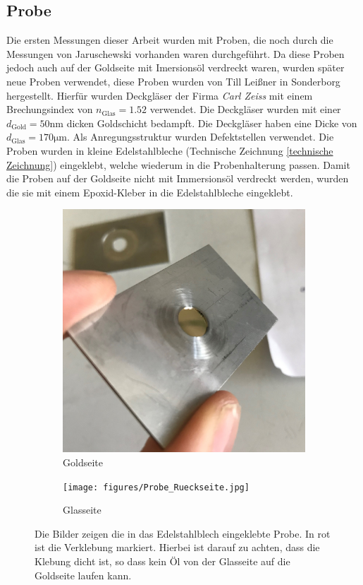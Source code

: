 \documentclass{article}
\begin{document}
\subsection{Probe}
	Die ersten Messungen dieser Arbeit wurden mit Proben, die noch durch die Messungen von Jaruschewski \cite{Jaruschewski.2020} vorhanden waren durchgeführt. Da diese Proben jedoch auch auf der Goldseite mit Imersionsöl verdreckt waren, wurden später neue Proben verwendet, diese Proben wurden von Till Leißner in Sonderborg hergestellt. Hierfür wurden Deckgläser der Firma \textit{Carl Zeiss} mit einem Brechungsindex von $n_{\mathrm{Glas}}= 1.52$ verwendet. Die Deckgläser wurden mit einer $d_{\mathrm{Gold}} = 50\mathrm{nm}$ dicken Goldschicht bedampft. Die Deckgläser haben eine Dicke von $d_{\mathrm{Glas}} = 170 \mathrm{\mu m}$. Als Anregungsstruktur wurden Defektstellen verwendet. Die Proben wurden in kleine Edelstahlbleche (Technische Zeichnung \ref{technische Zeichnung}) eingeklebt, welche wiederum in die Probenhalterung passen. Damit die Proben auf der Goldseite nicht mit Immersionsöl verdreckt werden, wurden die sie mit einem Epoxid-Kleber in die Edelstahlbleche eingeklebt.
	\begin{figure}
		\centering
		\begin{subfigure}[b]{0.4\textwidth}
			\centering
			\includegraphics[width=\textwidth]{figures/Probe_Vorderseite.jpg}
			\caption{Goldseite}
			\label{fig:probe_vorderseite}
		\end{subfigure}
		\hfill
		\begin{subfigure}[b]{0.4\textwidth}
			\centering
			\texttt{[image: figures/Probe\_Rueckseite.jpg]}
			\caption{Glasseite}
			\label{fig:probe_rueckseite}
		\end{subfigure}
		\caption{Die Bilder zeigen die in das Edelstahlblech eingeklebte Probe. In rot ist die Verklebung markiert. Hierbei ist darauf zu achten, dass die Klebung dicht ist, so dass kein Öl von der Glasseite auf die Goldseite laufen kann.}
		\label{fig:probe}
	\end{figure}
\end{document}
